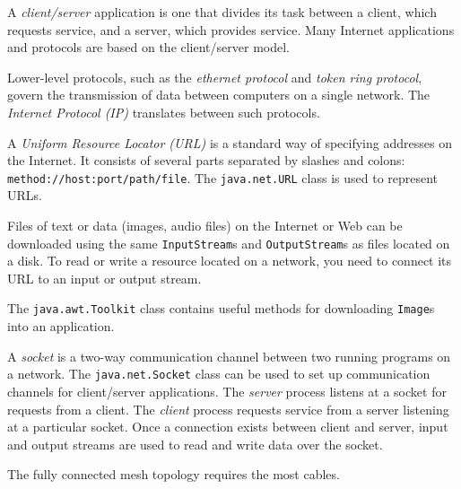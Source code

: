 {{{{\begin{SMBL}
\item  A {\it client/server} application is one that divides
its task between a client, which requests service, and a
server, which provides service.  Many Internet applications
and protocols are based on the client/server model.

\item  Lower-level protocols, such as the {\it ethernet protocol}
and {\it token ring protocol}, govern the transmission of data between
computers on a single network.  The {\it Internet Protocol (IP)}
translates between such protocols.

\item   A {\it Uniform Resource Locator (URL)} is a standard way of
specifying addresses on the Internet.  It consists of several parts
separated by slashes and colons: {\tt method://host:port/path/file}.
The {\tt java.net.URL} class is used to represent URLs.

\item  Files of text or data (images, audio files) on the Internet
or Web can be downloaded using the same {\tt InputStream}s and
{\tt OutputStream}s as files located on a disk.  To read or write
a resource located on a network, you need to connect its URL to
an input or output stream.

\item  The {\tt java.awt.Toolkit} class contains useful methods
for downloading {\tt Image}s into an application.

\item  A {\it socket} is a two-way communication channel between
two running programs on a network.  The {\tt java.net.Socket}
class can be used to set up communication channels for
client/server applications.  The {\it server} process
listens at a socket for requests from a client.  The {\it client}
process requests service from a server listening at a particular
socket.  Once a connection exists between client and server,
input and output streams are used to read and write data over
the socket.
\end{SMBL}

\secANSH

\begin{ANS}
\item  The fully connected mesh topology requires the most cables.


\end{ANS}}}}}
